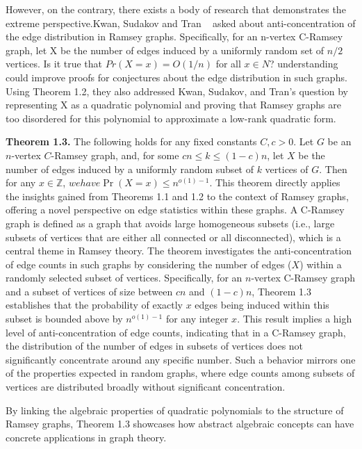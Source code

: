However, on the contrary, there exists 
a body of research that demonstrates 
the extreme perspective.Kwan, Sudakov and Tran
~\cite{kwan2019anticoncentration}
asked about anti-concentration of the
edge distribution in Ramsey graphs.
Specifically, for an n-vertex C-Ramsey graph,
let X be the number of edges induced by a uniformly 
random set of $n/2$ vertices. Is it true that
$Pr(X=x)=O(1/n)$ for all $x \in N$?
understanding could improve proofs for 
conjectures about the edge distribution in such graphs.
Using Theorem 1.2, they also addressed 
Kwan, Sudakov, and Tran's question by representing X
as a quadratic polynomial and proving that 
Ramsey graphs are too disordered for this 
polynomial to approximate a low-rank quadratic form.


\textbf{Theorem 1.3.} The following holds for any fixed constants
$C, c > 0$. Let $G$ be an $n$-vertex $C$-Ramsey graph, and, 
for some $cn \leq k \leq (1 - c)n$, let $X$ be the number of edges
induced by a uniformly random subset of $k$ vertices of $G$.
Then for any $x \in \mathbb{Z}$, $we have \Pr(X = x) \leq n^{o(1)-1}$.
This theorem directly applies the insights gained from 
Theorems 1.1 and 1.2 to the context of Ramsey graphs, 
offering a novel perspective on edge statistics within these graphs.
A C-Ramsey graph is defined as a graph that avoids large homogeneous
subsets (i.e., large subsets of vertices that are either all
connected or all disconnected), which is a central theme
in Ramsey theory. The theorem investigates the anti-concentration of edge counts in such graphs by considering the number of edges ($X$) within a randomly selected subset of vertices.
Specifically, for an $n$-vertex C-Ramsey graph and a subset
of vertices of size between $cn$ and $(1-c)n$,
Theorem 1.3 establishes that the probability of exactly $x$ edges
being induced within this subset is bounded above by $n^{o(1)-1}$
for any integer $x$. This result implies a high level of 
anti-concentration of edge counts, indicating that in a C-Ramsey graph,
the distribution of the number of edges in subsets of vertices
does not significantly concentrate around any specific number.
Such a behavior mirrors one of the properties expected in random
graphs, where edge counts among subsets of vertices are distributed
broadly without significant concentration.

By linking the algebraic properties of quadratic polynomials
to the structure of Ramsey graphs, Theorem 1.3 showcases how 
abstract algebraic concepts can have concrete applications in graph theory.

